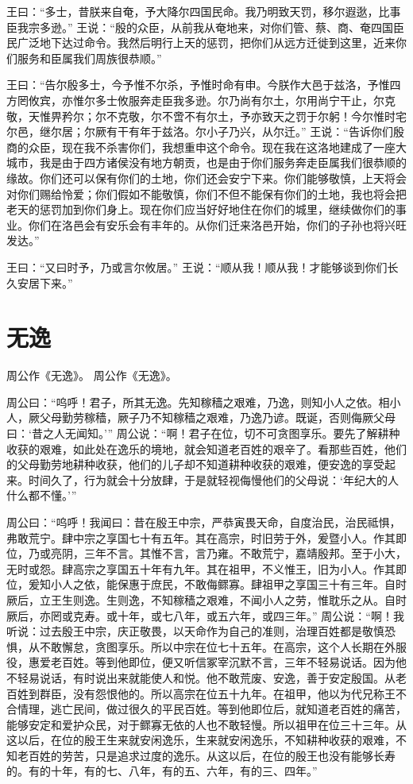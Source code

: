 \documentclass[12pt,UTF8]{ctexbook}
\begin{document}
王曰：“多士，昔朕来自奄，予大降尔四国民命。我乃明致天罚，移尔遐逖，比事臣我宗多逊。”
王说：“殷的众臣，从前我从奄地来，对你们管、蔡、商、奄四国臣民广泛地下达过命令。我然后明行上天的惩罚，把你们从远方迁徙到这里，近来你们服务和臣属我们周族很恭顺。”

王曰：“告尔殷多士，今予惟不尔杀，予惟时命有申。今朕作大邑于兹洛，予惟四方罔攸宾，亦惟尔多士攸服奔走臣我多逊。尔乃尚有尔土，尔用尚宁干止，尔克敬，天惟畀矜尔；尔不克敬，尔不啻不有尔土，予亦致天之罚于尔躬！今尔惟时宅尔邑，继尔居；尔厥有干有年于兹洛。尔小子乃兴，从尔迁。”
王说：“告诉你们殷商的众臣，现在我不杀害你们，我想重申这个命令。现在我在这洛地建成了一座大城市，我是由于四方诸侯没有地方朝贡，也是由于你们服务奔走臣属我们很恭顺的缘故。你们还可以保有你们的土地，你们还会安宁下来。你们能够敬慎，上天将会对你们赐给怜爱；你们假如不能敬慎，你们不但不能保有你们的土地，我也将会把老天的惩罚加到你们身上。现在你们应当好好地住在你们的城里，继续做你们的事业。你们在洛邑会有安乐会有丰年的。从你们迁来洛邑开始，你们的子孙也将兴旺发达。”

王曰：“又曰时予，乃或言尔攸居。”
王说：“顺从我！顺从我！才能够谈到你们长久安居下来。”

\chapter{无逸}

周公作《无逸》。
周公作《无逸》。

周公曰：“呜呼！君子，所其无逸。先知稼穑之艰难，乃逸，则知小人之依。相小人，厥父母勤劳稼穑，厥子乃不知稼穑之艰难，乃逸乃谚。既诞，否则侮厥父母曰：‘昔之人无闻知。’”
周公说：“啊！君子在位，切不可贪图享乐。要先了解耕种收获的艰难，如此处在逸乐的境地，就会知道老百姓的艰辛了。看那些百姓，他们的父母勤劳地耕种收获，他们的儿子却不知道耕种收获的艰难，便安逸的享受起来。时间久了，行为就会十分放肆，于是就轻视侮慢他们的父母说：‘年纪大的人什么都不懂。’”

周公曰：“呜呼！我闻曰：昔在殷王中宗，严恭寅畏天命，自度治民，治民祗惧，弗敢荒宁。肆中宗之享国七十有五年。其在高宗，时旧劳于外，爰暨小人。作其即位，乃或亮阴，三年不言。其惟不言，言乃雍。不敢荒宁，嘉靖殷邦。至于小大，无时或怨。肆高宗之享国五十年有九年。其在祖甲，不义惟王，旧为小人。作其即位，爰知小人之依，能保惠于庶民，不敢侮鳏寡。肆祖甲之享国三十有三年。自时厥后，立王生则逸。生则逸，不知稼穑之艰难，不闻小人之劳，惟耽乐之从。自时厥后，亦罔或克寿。或十年，或七八年，或五六年，或四三年。”
周公说：“啊！我听说：过去殷王中宗，庆正敬畏，以天命作为自己的准则，治理百姓都是敬慎恐惧，从不敢懈怠，贪图享乐。所以中宗在位七十五年。在高宗，这个人长期在外服役，惠爱老百姓。等到他即位，便又听信冢宰沉默不言，三年不轻易说话。因为他不轻易说话，有时说出来就能使人和悦。他不敢荒废、安逸，善于安定殷国。从老百姓到群臣，没有怨恨他的。所以高宗在位五十九年。在祖甲，他以为代兄称王不合情理，逃亡民间，做过很久的平民百姓。等到他即位后，就知道老百姓的痛苦，能够安定和爱护众民，对于鳏寡无依的人也不敢轻慢。所以祖甲在位三十三年。从这以后，在位的殷王生来就安闲逸乐，生来就安闲逸乐，不知耕种收获的艰难，不知老百姓的劳苦，只是追求过度的逸乐。从这以后，在位的殷王也没有能够长寿的。有的十年，有的七、八年，有的五、六年，有的三、四年。”
\end{document}
